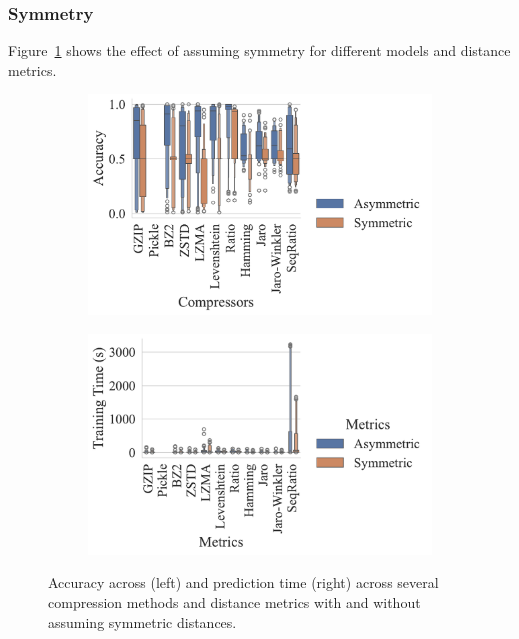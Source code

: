 \subsubsection{Symmetry}

Figure~\ref{fig:ddos_symmetry} shows the effect of assuming symmetry for different models and distance metrics.

\begin{figure}[h!]
    \centering
    \captionsetup[subfigure]{skip=0pt}
    \begin{subfigure}[t]{.44\textwidth}
        \centering
        \includegraphics[width=\textwidth]{figs/ddos/symmetric_vs_metric.pdf}
    \end{subfigure}
    \begin{subfigure}[t]{.44\textwidth}
        \centering
        \includegraphics[width=\textwidth]{figs/ddos/symmetric_vs_metric_train_time.pdf}
    \end{subfigure}
    \caption{Accuracy across (left) and prediction time (right) across several compression methods and distance metrics with and without assuming symmetric distances.}
    \label{fig:ddos_symmetry}
\end{figure}